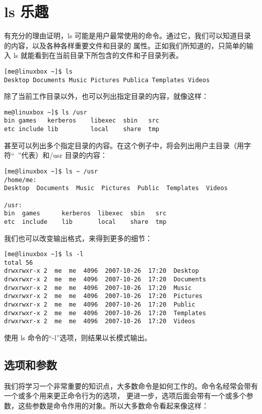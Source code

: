 \section{ls 乐趣}

有充分的理由证明，ls 可能是用户最常使用的命令。通过它，我们可以知道目录的内容，以及各种各样重要文件和目录的 属性。正如我们所知道的，只简单的输入 ls 就能看到在当前目录下所包含的文件和子目录列表。

\begin{lstlisting}
[me@linuxbox ~]$ ls
Desktop Documents Music Pictures Publica Templates Videos 
\end{lstlisting}

\par 除了当前工作目录以外，也可以列出指定目录的内容，就像这样：

\begin{lstlisting}
me@linuxbox ~]$ ls /usr
bin games   kerberos    libexec  sbin   src
etc include lib         local    share  tmp 
\end{lstlisting}

\par 甚至可以列出多个指定目录的内容。在这个例子中，将会列出用户主目录（用字符“~”代表）和/usr 目录的内容：

\begin{lstlisting}
[me@linuxbox ~]$ ls ~ /usr
/home/me:
Desktop  Documents  Music  Pictures  Public  Templates  Videos

/usr:
bin  games      kerberos  libexec  sbin   src
etc  include    lib       local    share  tmp 
\end{lstlisting}

\par 我们也可以改变输出格式，来得到更多的细节：

\begin{lstlisting}
[me@linuxbox ~]$ ls -l
total 56
drwxrwxr-x 2  me  me  4096  2007-10-26  17:20  Desktop
drwxrwxr-x 2  me  me  4096  2007-10-26  17:20  Documents
drwxrwxr-x 2  me  me  4096  2007-10-26  17:20  Music
drwxrwxr-x 2  me  me  4096  2007-10-26  17:20  Pictures
drwxrwxr-x 2  me  me  4096  2007-10-26  17:20  Public
drwxrwxr-x 2  me  me  4096  2007-10-26  17:20  Templates
drwxrwxr-x 2  me  me  4096  2007-10-26  17:20  Videos
\end{lstlisting}

\par 使用 ls 命令的“-l”选项，则结果以长模式输出。


\subsection{选项和参数}
我们将学习一个非常重要的知识点，大多数命令是如何工作的。命令名经常会带有一个或多个用来更正命令行为的选项， 更进一步，选项后面会带有一个或多个参数，这些参数是命令作用的对象。所以大多数命令看起来像这样：

